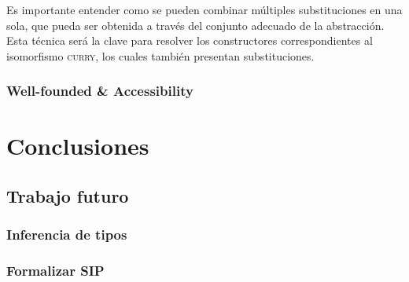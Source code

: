 \documentclass[]{report}
\begin{document}
	Es importante entender como se pueden combinar múltiples substituciones en una sola, que pueda ser obtenida a través del conjunto adecuado de la abstracción.
	Esta técnica será la clave para resolver los constructores correspondientes al isomorfismo \textsc{curry}, los cuales también presentan substituciones.
	
	
	\subsection{Well-founded \& Accessibility}
	
	
	\chapter{Conclusiones}
	
	\section{Trabajo futuro}
	\subsection{Inferencia de tipos}
	\subsection{Formalizar SIP}
	
	
	\printbibliography
	
\end{document}

